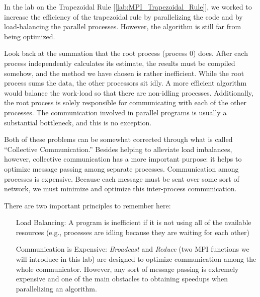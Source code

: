 \label{lab:MPI_Collective_Communication}

  In the lab on the Trapezoidal Rule [\ref{lab:MPI_Trapezoidal_Rule}], we worked to increase the efficiency of the trapezoidal rule by parallelizing the code and by load-balancing the parallel processes. However, the algorithm is still far from being optimized.

  Look back at the summation that the root process (process 0) does. After each process independently calculates its estimate, the results must be compiled somehow, and the method we have chosen is rather inefficient. While the root process sums the data, the other processors sit idly. A more efficient algorithm would balance the work-load so that there are non-idling processes. Additionally, the root process is solely responsible for communicating with each of the other processes. The communication involved in parallel programs is usually a substantial bottleneck, and this is no exception. 

  Both of these problems can be somewhat corrected through what is called ``Collective Communication.'' Besides helping to alleviate load imbalances, however, collective communication has a more important purpose: it helps to optimize message passing among separate processes. Communication among processes is expensive. Because each message must be sent over some sort of network, we must minimize and optimize this inter-process communication.

  There are two important principles to remember here:
  \begin{enumerate}
  \item[Load Balancing:]
    A program is inefficient if it is not using all of the available resources (e.g., processes are idling because they are waiting for each other)
  \item[Communication is Expensive:]
    \emph{Broadcast} and \emph{Reduce} (two MPI functions we will introduce in this lab) are designed to optimize communication among the whole communicator. However, any sort of message passing is extremely expensive and one of the main obstacles to obtaining speedups when parallelizing an algorithm.
  \end{enumerate}


